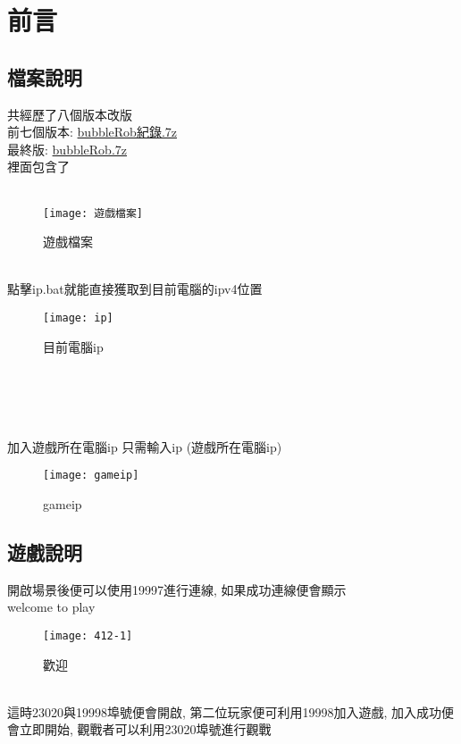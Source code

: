 \chapter{前言}
\renewcommand{\baselinestretch}{10.0} %
\setcounter{page}{1}  %
\fontsize{14pt}{2.5pt}\sectionef
\section{檔案說明}
共經歷了八個版本改版\\
前七個版本:
\href{https://mdecd2023.github.io/football-apj1/downloads/ag4/bubbleRob%E7%B4%80%E9%8C%84.7z}{bubbleRob紀錄.7z}\\
最終版:
\href{https://mdecd2023.github.io/football-apj1/downloads/ag4/bubbleRob.7z}{bubbleRob.7z}\\
裡面包含了\\
\\
\begin{figure}[hbt!]
\begin{center}
\texttt{[image: 遊戲檔案]}
\caption{\Large 遊戲檔案}\label{遊戲檔案}
\end{center}
\end{figure} 
\qquad \\
點擊ip.bat就能直接獲取到目前電腦的ipv4位置\\
\begin{figure}[hbt!]
\begin{center}
\texttt{[image: ip]}
\caption{\Large 目前電腦ip}\label{目前電腦ip}
\end{center}
\end{figure} 
\qquad \\
\\
\\
\\
 加入遊戲所在電腦ip 只需輸入ip (遊戲所在電腦ip)
 \begin{figure}[hbt!]
\begin{center}
\texttt{[image: gameip]}
\caption{\Large gameip}\label{gameip}
\end{center}
\end{figure} 
\section{遊戲說明}
開啟場景後便可以使用19997進行連線,
如果成功連線便會顯示\\
welcome to play\\
\begin{figure}[hbt!]
\begin{center}
\texttt{[image: 412-1]}
\caption{\Large 歡迎}\label{歡迎}
\end{center}
\end{figure} 
\qquad \\
這時23020與19998埠號便會開啟,
第二位玩家便可利用19998加入遊戲,
加入成功便會立即開始,
觀戰者可以利用23020埠號進行觀戰
